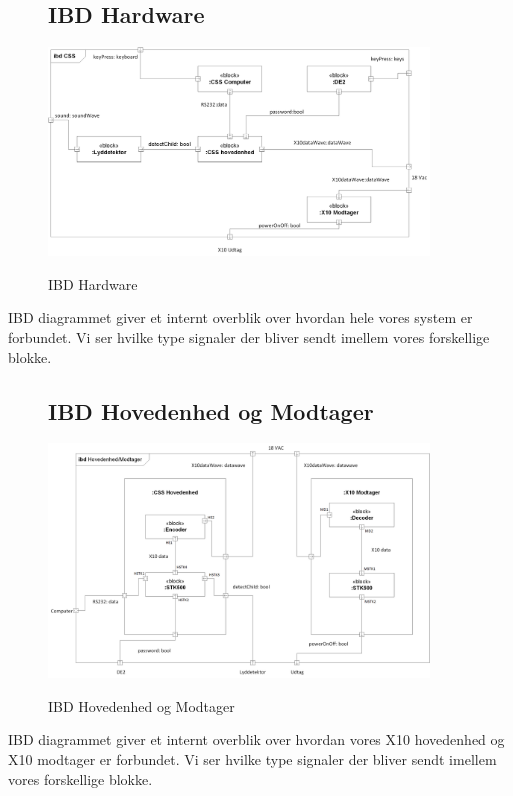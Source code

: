 \begin{figure}[!htbp] \centering
\subsection{IBD Hardware}
{\includegraphics[width=0.9\textwidth]{billeder/diagrammer/IBD_Hardware}}
\caption{IBD Hardware}
\label{lab:ibdhardware}
\raggedright
\end{figure}
IBD diagrammet giver et internt overblik over hvordan hele vores system er forbundet. Vi ser hvilke type signaler der bliver sendt imellem vores forskellige blokke.

\begin{figure}[!htbp] \centering
\subsection{IBD Hovedenhed og Modtager}
{\includegraphics[width=0.9\textwidth]{billeder/diagrammer/IBD_Hovedenhed_Modtager}}
\caption{IBD Hovedenhed og Modtager}
\label{lab:ibdhovedenhedmodtager}
\raggedright
\end{figure}
IBD diagrammet giver et internt overblik over hvordan vores X10 hovedenhed og X10 modtager er forbundet. Vi ser hvilke type signaler der bliver sendt imellem vores forskellige blokke.


